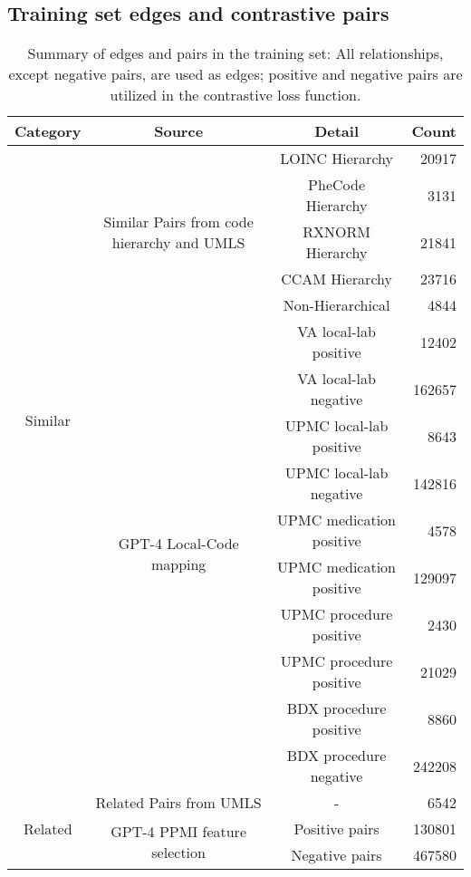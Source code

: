 \documentclass{article}
\begin{document}
\subsection{Training set edges and contrastive pairs}
\label{sec:S1}
\begin{table}[H]
\centering
\begin{tabular}{c | c c r}
\hline
\textbf{Category} & \textbf{Source} & \textbf{Detail} & \textbf{Count} \\
\hline
\multirow{13}{*}{Similar}  & \multirow{5}{*}{Similar Pairs from code hierarchy and UMLS} & LOINC Hierarchy & 20917 \\
 & & PheCode Hierarchy & 3131 \\
 & & RXNORM Hierarchy & 21841 \\
 & & CCAM Hierarchy & 23716 \\
 & & Non-Hierarchical & 4844 \\
\cline{2-4}
 & \multirow{10}{*}{GPT-4 Local-Code mapping} & VA local-lab positive & 12402 \\
 & & VA local-lab negative & 162657 \\
 & & UPMC local-lab positive & 8643 \\
 & & UPMC local-lab negative &  142816\\
 & & UPMC medication positive & 4578 \\
 & & UPMC medication positive &  129097\\
  & & UPMC procedure positive & 2430 \\
 & & UPMC procedure positive & 21029 \\
 & & BDX procedure positive &  8860 \\
 & & BDX procedure negative &  242208\\
\hline
\multirow{3}{*}{Related} & Related Pairs from UMLS & - & 6542 \\
\cline{2-4}
 & \multirow{2}{*}{GPT-4 PPMI feature selection} & Positive pairs & 130801 \\
 & & Negative pairs & 467580 \\
 \hline
\end{tabular}
\caption{Summary of edges and pairs in the training set: All relationships, except negative pairs, are used as edges; positive and negative pairs are utilized in the contrastive loss function.}
\label{edge_count}
\end{table}
\end{document}
